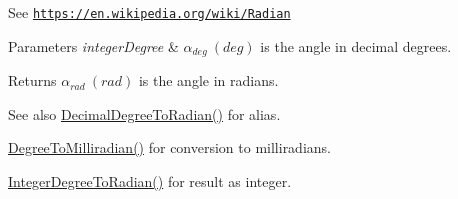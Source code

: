 See \href{https://en.wikipedia.org/wiki/Radian}{\tt https\+://en.\+wikipedia.\+org/wiki/\+Radian} 
\begin{DoxyParams}{Parameters}
{\em integer\+Degree} & $\alpha_{deg}\ (deg)$ is the angle in decimal degrees. \\
\hline
\end{DoxyParams}
\begin{DoxyReturn}{Returns}
$\alpha_{rad}\ (rad)$ is the angle in radians. 
\end{DoxyReturn}
\begin{DoxySeeAlso}{See also}
\mbox{\hyperlink{group___e_g_x_math-_angle_conversions-_decimal_degree_ga906ee2c83cdf4caa59eb613dc2d5d52a}{Decimal\+Degree\+To\+Radian()}} for alias. 

\mbox{\hyperlink{group___e_g_x_math-_angle_conversions-_degree_gae4fa6c2d3805430760783650cfbfdb11}{Degree\+To\+Milliradian()}} for conversion to milliradians. 

\mbox{\hyperlink{group___e_g_x_math-_angle_conversions-_integer_degree_ga05d3368b00ea27b9895de2ffe5c8df38}{Integer\+Degree\+To\+Radian()}} for result as integer. 
\end{DoxySeeAlso}
